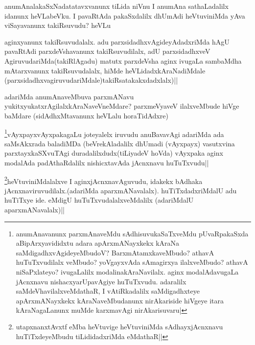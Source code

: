 \begin{artha}
anumAnalakaSxNadatatavxvanunx tiLida niVnu  I anumAna sathaLadalilx idanunx heVLabeVku. I pavaRtAda pakaSxdalilx dhUmAdi heVtuviniMda yAva viSayavanunx takiRsuvudu? heVLu
\end{artha}

\begin{artha}
aginxyanunx takiRsuvudalalx. adu parxsidadhxvAgideyAdadxriMda hAgU pavaRtAdi parxdeVshavanunx takiRsuvudilalx, adU parxsidadhxveV AgiruvudariMda(takiRlAgadu) matutx parxdeVsha aginx ivugaLa sambaMdha mAtarxvanunx takiRsuvudalalx, hiMde heVLidadxkAraNadiMdale (parxsidadhxvagiruvudariMdale)takiRsatakakxdadxlalx)||
\end{artha}


\begin{artha}
adariMda anumAnaveMbuva parxmANavu yukitxyukatxrAgilalxkAraNaveVneMdare? parxmeVyaveV ilalxveMbude hiVge baMdare (sidAdhxMtavanunx heVLalu horaTidAdxre)
\end{artha}

\begin{artha}
\footnote{anumAnavanunx parxmAnaveMdu sAdhisuvukaSaTxveMdu pUvaRpakaSxda aBipArxyavididxtu adara apArxmANayxkekx kAraNa saMdigadhxvAgideyeMbudoV? BarxmAtamxkaveMbudo? athavA huTuTxvudilalx veMbudo? yoVgayxvAda sAmagirxya ilalxveMbudo? athavA niSaPxlateyo? ivugaLalilx modalinakAraNavilalx. aginx modalAdavugaLa jAcnxnavu nishacxyarUpavAgiye huTuTxvudu. adaralilx saMdeVhavilalxveMdathaR, I vAtiRkadalilx saMdigadhxteye apArxmANayxkekx kAraNaveMbudanunx nirAkariside hiVgeye itara kAraNagaLanunx muMde karxmavAgi nirAkarisuvaru|}vAyxpayxvAyxpakagaLu joteyalelx iruvudu anuBavavAgi adariMda ada saMsAkxrada baladiMDa (beVrekAladalilx dhUmadi (vAyxpayx) vasutxvina parxtayxkaSXvuTAgi duradalilxdudx(tiLiyadeV hoVda) vAyxpaka aginx modalAda padAthaRdalilx nishicxtavAda jAcnxnavu huTuTxvudu||
\end{artha}

\begin{artha}
\footnote{utapxnanxtAvxtf eMba heVtuvige heVtuviniMda sAdhayxjAcnxnavu huTiTxdeyeMbudu tiLididadxriMda eMdathaR||}heVtuviniMdalalxve  I aginxjAcnxnavAguvudu, idakekx bAdhaka jAcnxnaviruvudilalx.(adariMda aparxmANavalalx). huTiTxdadxriMdalU adu huTiTxye ide. eMdigU huTuTxvudalalxveMdalilx (adariMdalU aparxmANavalalx)||
\end{artha}

